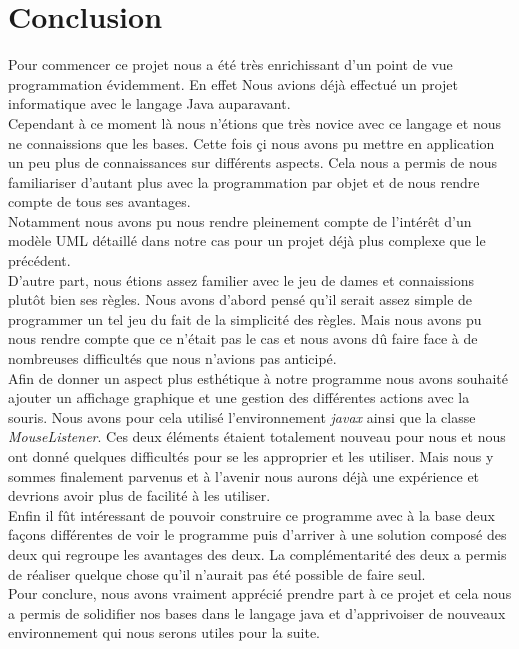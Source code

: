 \documentclass[12,french]{report}
\begin{document}
\chapter*{Conclusion}

Pour commencer ce projet nous a été très enrichissant d'un point de vue programmation évidemment. En effet Nous avions déjà effectué un projet informatique avec le langage Java auparavant. \\
Cependant à ce moment là nous n'étions que très novice avec ce langage et nous ne connaissions que les bases. Cette fois çi nous avons pu mettre en application un peu plus de connaissances sur différents aspects. Cela nous a permis de nous familiariser d'autant plus avec la programmation par objet et de nous rendre compte de tous ses avantages.\\
Notamment nous avons pu nous rendre pleinement compte de l'intérêt d'un modèle UML détaillé dans notre cas pour un projet déjà plus complexe que le précédent.\\

D'autre part, nous étions assez familier avec le jeu de dames et connaissions plutôt bien ses règles. Nous avons d'abord pensé qu'il serait assez simple de programmer un tel jeu du fait de la simplicité des règles. Mais nous avons pu nous rendre compte que ce n'était pas le cas et nous avons dû faire face à de nombreuses difficultés que nous n'avions pas anticipé.\\

Afin de donner un aspect plus esthétique à notre programme nous avons souhaité ajouter un affichage graphique et une gestion des différentes actions avec la souris. Nous avons pour cela utilisé l'environnement \textit{javax} ainsi que la classe \textit{MouseListener}. Ces deux éléments étaient totalement nouveau pour nous et nous ont donné quelques difficultés pour se les approprier et les utiliser. Mais nous y sommes finalement parvenus et à l'avenir nous aurons déjà une expérience et devrions avoir plus de facilité à les utiliser. \\

Enfin il fût intéressant de pouvoir construire ce programme avec à la base deux façons différentes de voir le programme puis d'arriver à une solution composé des deux qui regroupe les avantages des deux. La complémentarité des deux a permis de réaliser quelque chose qu'il n'aurait pas été possible de faire seul.\\

Pour conclure, nous avons vraiment apprécié prendre part à ce projet et cela nous a permis de solidifier nos bases dans le langage java et d'apprivoiser de nouveaux environnement qui nous serons utiles pour la suite.
\end{document}
